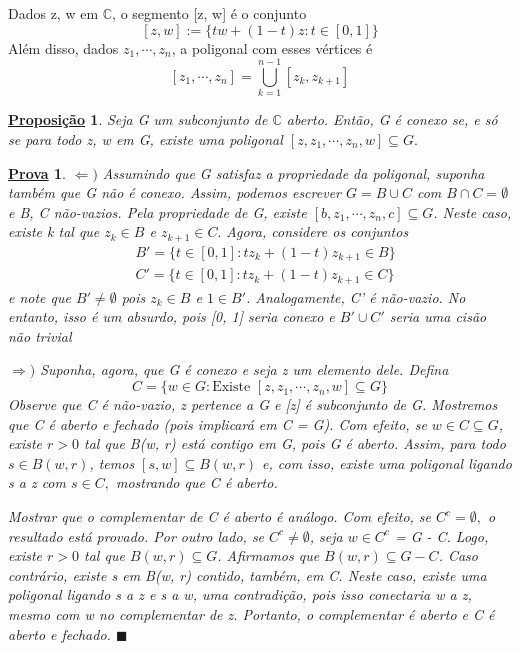 \documentclass{article}
\newtheorem*{proof*}{\underline{Prova}}
\newtheorem*{prop*}{\underline{Proposi\c c\~ao}}
\renewcommand\qedsymbol{$\blacksquare$}
\begin{document}
  Dados z, w em $\mathbb{C}$, o segmento [z, w] \'e o conjunto
  $$
  [z, w]:= \{tw + (1-t)z: t\in[0, 1]\}
  $$
  Al\'em disso, dados $z _{1}, \cdots, z _{n}$, a poligonal com esses v\'ertices \'e
  $$
  [z _{1}, \cdots, z _{n}] = \bigcup _{k=1}^{n-1}[z _{k}, z _{k+1}]
  $$
 \begin{prop*}
   Seja G um subconjunto de $\mathbb{C}$ aberto. Ent\~ao, G \'e conexo se, e s\'o se para todo z, w em G, existe uma poligonal
  $[z, z _{1}, \cdots, z _{n}, w]\subseteq{G}.$
 \end{prop*}
\begin{proof*}
  $\Leftarrow)$ Assumindo que G satisfaz a propriedade da poligonal, suponha tamb\'em que G n\~ao \'e conexo. Assim,
podemos escrever $G = B\cup{C}$ com $B\cap{C}=\emptyset$ e B, C n\~ao-vazios. Pela propriedade de G, existe 
  $[b, z _{1}, \cdots, z _{n}, c]\subseteq{G}$. Neste caso, existe k tal que $z _{k}\in{B}$ e $z _{k+1}\in{C}.$ Agora,
  considere os conjuntos 
 \begin{align*}
   &B' = \{t\in[0, 1]: tz _{k} + (1 - t)z _{k+1}\in{B}\}\\
   &C' = \{t\in[0, 1]: tz _{k} + (1 - t)z _{k+1}\in{C}\}
 \end{align*}
e note que $B'\neq{\emptyset}$ pois $z _{k}\in{B}$ e $1\in{B'}$. Analogamente, C' \'e n\~ao-vazio. No entanto, isso \'e um absurdo,
pois [0, 1] seria conexo e $B'\cup{C'}$ seria uma cis\~ao n\~ao trivial

 $\Rightarrow)$ Suponha, agora, que G \'e conexo e seja z um elemento dele. Defina 
 $$
 C = \{w\in{G}: \text{Existe } [z, z _{1}, \cdots, z _{n}, w]\subseteq{G}\}
 $$
 Observe que C \'e n\~ao-vazio, z pertence a G e [z] \'e subconjunto de G. Mostremos que C \'e aberto e fechado (pois implicar\'a em C = G).
Com efeito, se $w\in{C}\subseteq{G}$, existe $r>0$ tal que B(w, r) est\'a contigo em G, pois G \'e aberto.
 Assim, para todo $s\in B(w, r)$, temos $[s, w]\subseteq{B(w, r)}$ e, com isso, existe uma poligonal ligando s a z com $s\in{C},$ mostrando 
que C \'e aberto.

  Mostrar que o complementar de C \'e aberto \'e an\'alogo. Com efeito, se $C ^{c} = \emptyset,$ o resultado est\'a provado. Por outro
lado, se $C ^{c}\neq\emptyset$, seja $w\in{C ^{c}}$ = G - C. Logo, existe $r > 0$ tal que $B(w, r)\subseteq{G}$. Afirmamos
que $B(w, r)\subseteq{G-C}$. Caso contr\'ario, existe s em B(w, r) contido, tamb\'em, em C. Neste caso, existe uma poligonal
ligando s a z e s a w, uma contradi\c c\~ao, pois isso conectaria w a z, mesmo com w no complementar de z. Portanto, o complementar
\'e aberto e C \'e aberto e fechado. \qedsymbol
\end{proof*}
\newpage
\end{document}
